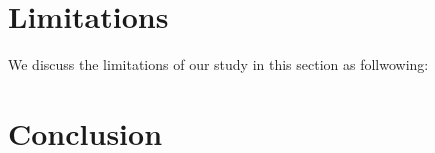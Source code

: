 \documentclass[conference]{IEEEtran}
\begin{document}
\section{Limitations}
\label{limitation}
We discuss the limitations of our study in this section as follwowing: 

  

\section{Conclusion}
\label{conclusion}
 

















\end{document}
